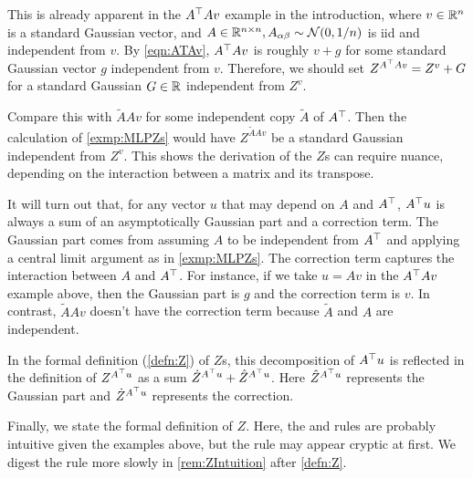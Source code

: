 \documentclass[main.tex]{subfiles}
\begin{document}
\begin{exmp}\label{exmp:ATAvZ}
This is already apparent in the $A^\top A v$ example in the introduction, where $v\in\mathbb{R}^{n}$ is a standard Gaussian vector, and $A\in\mathbb{R}^{n\times n},A_{\alpha\beta}\sim\mathcal{N}(0,1/n)$ is iid and independent from $v$.
By \cref{eqn:ATAv}, $A^\top A v$ is roughly $v + g$ for some standard Gaussian vector $g$ independent from $v$.
Therefore, we should set $Z^{A^\top A v} = Z^v + G$ for a standard Gaussian $G\in \mathbb{R}$ independent from $Z^v$.

Compare this with $\tilde A A v$ for some independent copy $\tilde A$ of $A^\top$.
Then the calculation of \cref{exmp:MLPZs} would have $Z^{\tilde A A v}$ be a standard Gaussian independent from $Z^v$.
This shows the derivation of the $Z$s can require nuance, depending on the interaction between a matrix and its transpose.

It will turn out that, for any vector $u$ that may depend on $A$ and $A^\top$, $A^\top u$ is always a sum of an asymptotically Gaussian part and a correction term.
The Gaussian part comes from assuming $A$ to be independent from $A^\top$ and applying a central limit argument as in \cref{exmp:MLPZs}.
The correction term captures the interaction between $A$ and $A^\top$.
For instance, if we take $u = Av$ in the $A^\top A v$ example above, then the Gaussian part is $g$ and the correction term is $v$.
In contrast, $\tilde A A v$ doesn't have the correction term because $\tilde A$ and $A$ are independent.

In the formal definition (\cref{defn:Z}) of $Z$s, this decomposition of $A^\top u$ is reflected in the definition of $Z^{A^\top u}$ as a sum $\dot Z^{A^\top u} + \hat Z^{A^\top u}$.
Here $\hat Z^{A^\top u}$ represents the Gaussian part and $\dot Z^{A^\top u}$ represents the correction.
\end{exmp}

Finally, we state the formal definition of $Z$.
Here, the  and  rules are probably intuitive given the examples above, but the  rule may appear cryptic at first.
We digest the  rule more slowly in \cref{rem:ZIntuition} after \cref{defn:Z}.
\end{document}
